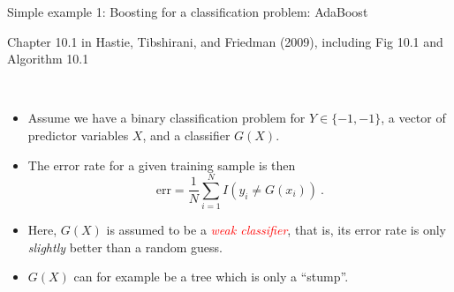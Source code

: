 \documentclass[
  10pt,
  ignorenonframetext,
]{beamer}
\providecommand{\tightlist}{%
  \setlength{\itemsep}{0pt}\setlength{\parskip}{0pt}}
\begin{document}
\begin{frame}
\begin{block}{Simple example 1: Boosting for a classification problem:
AdaBoost}
\protect\hypertarget{simple-example-1-boosting-for-a-classification-problem-adaboost}{}
\tiny

Chapter 10.1 in Hastie, Tibshirani, and Friedman (2009), including Fig
10.1 and Algorithm 10.1

\normalsize

\(~\)

\begin{itemize}
\tightlist
\item
  Assume we have a binary classification problem for \(Y\in \{-1,-1\}\),
  a vector of predictor variables \(X\), and a classifier \(G(X)\).
\end{itemize}

\vspace{2mm}

\begin{itemize}
\tightlist
\item
  The error rate for a given training sample is then
  \[\text{err} =\frac{1}{N} \sum_{i=1}^N I(y_i \neq G(x_i)) \ .\]
\end{itemize}

\vspace{2mm}

\begin{itemize}
\tightlist
\item
  Here, \(G(X)\) is assumed to be a
  \emph{\textcolor{red}{weak classifier}}, that is, its error rate is
  only \emph{slightly} better than a random guess.
\end{itemize}

\vspace{2mm}

\begin{itemize}
\tightlist
\item
  \(G(X)\) can for example be a tree which is only a ``stump''.
\end{itemize}
\end{block}
\end{frame}
\end{document}
